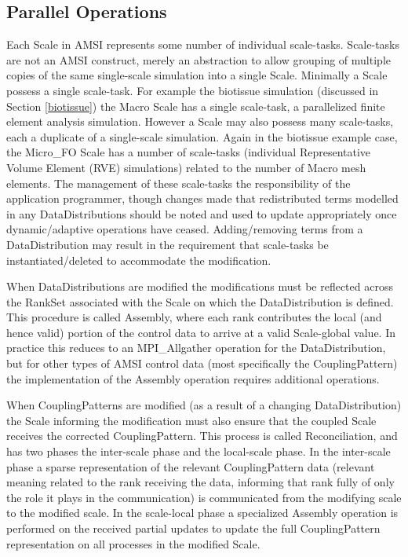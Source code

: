 \documentclass[11pt]{article}
\begin{document}
\subsection{Parallel Operations}\label{paralle_ops}

Each Scale in AMSI represents some number of individual scale-tasks.
Scale-tasks are not an AMSI construct, merely an abstraction to allow grouping of multiple copies of the same single-scale simulation into a single Scale.
Minimally a Scale possess a single scale-task.
For example the biotissue simulation (discussed in Section \ref{biotissue}) the Macro Scale has a single scale-task, a parallelized finite element analysis simulation.
However a Scale may also possess many scale-tasks, each a duplicate of a single-scale simulation.
Again in the biotissue example case, the Micro\_FO Scale has a number of scale-tasks (individual Representative Volume Element (RVE) simulations) related to the number of Macro mesh elements.
The management of these scale-tasks the responsibility of the application programmer, though changes made that redistributed terms modelled in any DataDistributions should be noted and used to update appropriately once dynamic/adaptive operations have ceased.
Adding/removing terms from a DataDistribution may result in the requirement that scale-tasks be instantiated/deleted to accommodate the modification.

When DataDistributions are modified the modifications must be reflected across the RankSet associated with the Scale on which the DataDistribution is defined.
This procedure is called Assembly, where each rank contributes the local (and hence valid) portion of the control data to arrive at a valid Scale-global value.
In practice this reduces to an MPI\_Allgather operation for the DataDistribution, but for other types of AMSI control data (most specifically the CouplingPattern) the implementation of the Assembly operation requires additional operations.

When CouplingPatterns are modified (as a result of a changing DataDistribution) the Scale informing the modification must also ensure that the coupled Scale receives the corrected CouplingPattern.
This process is called Reconciliation, and has two phases the inter-scale phase and the local-scale phase.
In the inter-scale phase a sparse representation of the relevant CouplingPattern data (relevant meaning related to the rank receiving the data, informing that rank fully of only the role it plays in the communication) is communicated from the modifying scale to the modified scale.
In the scale-local phase a specialized Assembly operation is performed on the received partial updates to update the full CouplingPattern representation on all processes in the modified Scale.
\end{document}
